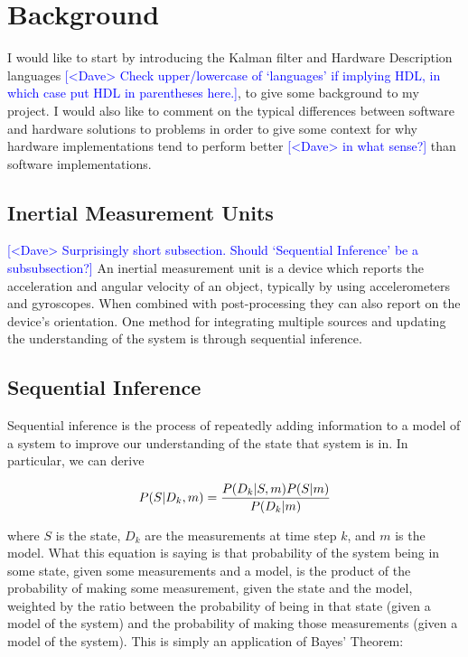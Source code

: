 \documentclass[12pt]{article}
\newcommand{\note}[2][red]{\textcolor{#1}{#2}}
\newcommand{\notedme}[1]{\note[blue]{[<Dave> #1]}}
\begin{document}
\section{Background}

I would like to start by introducing the Kalman filter and Hardware Description languages \notedme{Check upper/lowercase of `languages' if implying HDL, in which case put HDL in parentheses here.}, to give some background to my project. I would also like to comment on the typical differences between software and hardware solutions to problems in order to give some context for why hardware implementations tend to perform better \notedme{in what sense?} than software implementations.

\subsection{Inertial Measurement Units}

\notedme{Surprisingly short subsection. Should `Sequential Inference' be a subsubsection?}
An inertial measurement unit is a device which reports the acceleration and angular velocity of an object, typically by using accelerometers and gyroscopes. When combined with post-processing they can also report on the device's orientation. One method for integrating multiple sources and updating the understanding of the system is through sequential inference.

\subsection{Sequential Inference}

Sequential inference \cite{morrison_2016} is the process of repeatedly adding information to a model of a system to improve our understanding of the state that system is in. In particular, we can derive \cite{morrison_2016}

\begin{equation}
	\label{si}
	P(S | D_k, m) = {P(D_k | S, m) P(S | m) \over P(D_k | m)}
\end{equation}

\noindent where $S$ is the state, $D_k$ are the measurements at time step $k$, and $m$ is the model. What this equation is saying is that probability of the system being in some state, given some measurements and a model, is the product of the probability of making some measurement, given the state and the model, weighted by the ratio between the probability of being in that state (given a model of the system) and the probability of making those measurements (given a model of the system). This is simply an application of Bayes' Theorem:
\end{document}
